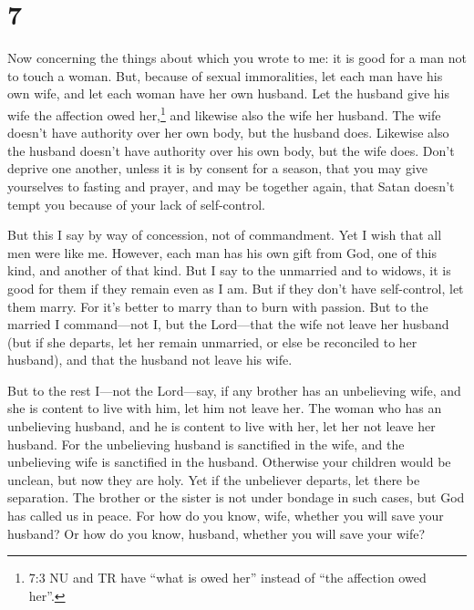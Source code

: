 \hypertarget{section-6}{%
\section{7}\label{section-6}}

 Now concerning the things about which you wrote to me: it
is good for a man not to touch a woman.  But, because of
sexual immoralities, let each man have his own wife, and let each woman
have her own husband.  Let the husband give his wife the
affection owed her,\footnote{7:3 NU and TR have ``what is owed her''
  instead of ``the affection owed her''.} and likewise also the wife her
husband.  The wife doesn't have authority over her own body,
but the husband does. Likewise also the husband doesn't have authority
over his own body, but the wife does.  Don't deprive one
another, unless it is by consent for a season, that you may give
yourselves to fasting and prayer, and may be together again, that Satan
doesn't tempt you because of your lack of self-control.

 But this I say by way of concession, not of commandment.
 Yet I wish that all men were like me. However, each man has
his own gift from God, one of this kind, and another of that kind.
 But I say to the unmarried and to widows, it is good for
them if they remain even as I am.  But if they don't have
self-control, let them marry. For it's better to marry than to burn with
passion.  But to the married I command---not I, but the
Lord---that the wife not leave her husband  (but if she
departs, let her remain unmarried, or else be reconciled to her
husband), and that the husband not leave his wife.

 But to the rest I---not the Lord---say, if any brother has
an unbelieving wife, and she is content to live with him, let him not
leave her.  The woman who has an unbelieving husband, and
he is content to live with her, let her not leave her husband.
 For the unbelieving husband is sanctified in the wife, and
the unbelieving wife is sanctified in the husband. Otherwise your
children would be unclean, but now they are holy.  Yet if
the unbeliever departs, let there be separation. The brother or the
sister is not under bondage in such cases, but God has called us in
peace.  For how do you know, wife, whether you will save
your husband? Or how do you know, husband, whether you will save your
wife?

